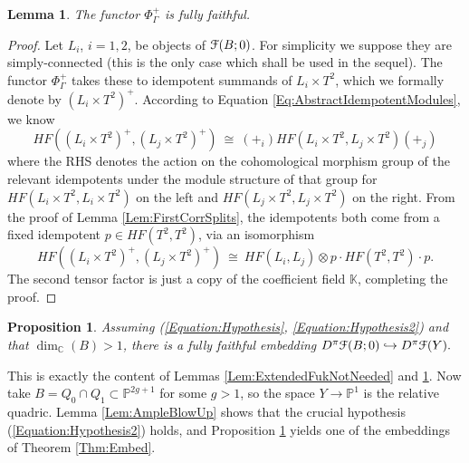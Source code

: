 \documentclass[reqno,10pt]{amsart}
\numberwithin{equation}{section}
\newcommand{\bC}{{\mathbb C}}
\newcommand{\bK}{{\mathbb K}}
\newcommand{\bP}{{\mathbb P}}
\newcommand{\scrF}{\EuScript{F}}
\newtheorem{Lemma}[thm]{Lemma}
\newtheorem{Proposition}[thm]{Proposition}
\theoremstyle{remark}
\begin{document}
\begin{Lemma} \label{Lem:FullyFaithful}
The functor $\Phi_{\Gamma}^+$ is fully faithful.
\end{Lemma}

\begin{proof}
Let $L_i$, $i=1,2$, be objects of $\scrF(B;0)$. For simplicity we suppose they are simply-connected (this is the only case which shall be used in the sequel).  The functor $\Phi_{\Gamma}^+$ takes these to idempotent summands of $L_i\times T^2$, which we formally denote by $(L_i\times T^2)^+$.  According to Equation \ref{Eq:AbstractIdempotentModules}, we know
\[
HF((L_i\times T^2)^+, (L_j \times T^2)^+) \ \cong \ (+_i)HF(L_i\times T^2, L_j\times T^2)(+_j)
\]
where the RHS denotes the action on the cohomological morphism group of the relevant idempotents under the module structure of that group for $HF(L_i\times T^2, L_i\times T^2)$ on the left and $HF(L_j\times T^2, L_j\times T^2)$ on the right. From the proof of Lemma \ref{Lem:FirstCorrSplits}, the idempotents both come from a fixed idempotent $p \in HF(T^2,T^2)$, via an isomorphism
\[
HF((L_i\times T^2)^+, (L_j \times T^2)^+) \ \cong \ HF(L_i,L_j) \otimes p\cdot HF(T^2,T^2)\cdot p.
\] 
The second tensor factor is just a copy of the coefficient field $\bK$, completing the proof.
\end{proof}


\begin{Proposition} \label{Prop:BlowUpEmbeds}
Assuming  (\ref{Equation:Hypothesis}, \ref{Equation:Hypothesis2}) and that $\dim_{\bC}(B)>1$, there is a fully faithful embedding $D^{\pi}\scrF(B;0) \hookrightarrow D^{\pi}\scrF(Y).$
\end{Proposition}

This is exactly the content of Lemmas  \ref{Lem:ExtendedFukNotNeeded} and \ref{Lem:FullyFaithful}.
Now take $B=Q_0\cap Q_1 \subset \bP^{2g+1}$ for some $g>1$, so the space $Y \rightarrow \bP^1$ is the relative quadric.  Lemma \ref{Lem:AmpleBlowUp} shows that the crucial hypothesis (\ref{Equation:Hypothesis2}) holds, and Proposition \ref{Prop:BlowUpEmbeds} yields one of the embeddings of  Theorem \ref{Thm:Embed}.  
\end{document}
